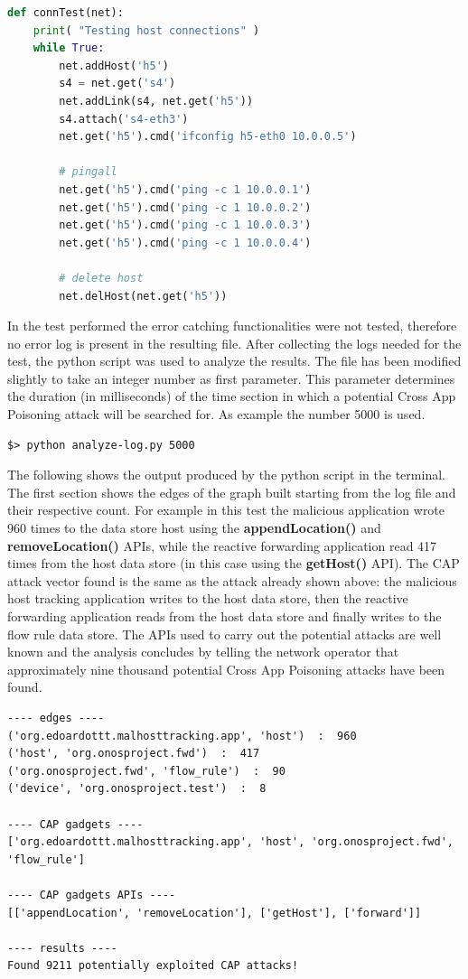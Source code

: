 \begin{lstlisting}[language=python]
def connTest(net):
    print( "Testing host connections" )
    while True:
        net.addHost('h5')
        s4 = net.get('s4')
        net.addLink(s4, net.get('h5'))
        s4.attach('s4-eth3')
        net.get('h5').cmd('ifconfig h5-eth0 10.0.0.5')

        # pingall
        net.get('h5').cmd('ping -c 1 10.0.0.1')
        net.get('h5').cmd('ping -c 1 10.0.0.2')
        net.get('h5').cmd('ping -c 1 10.0.0.3')
        net.get('h5').cmd('ping -c 1 10.0.0.4')
        
        # delete host
        net.delHost(net.get('h5'))
\end{lstlisting}
In the test performed the error catching functionalities were not tested, therefore no error log is present in the resulting file. After collecting the logs needed for the test, the python script was used to analyze the results. The file has been modified slightly to take an integer number as first parameter. This parameter determines the duration (in milliseconds) of the time section in which a potential Cross App Poisoning attack will be searched for. As example the number 5000 is used.
\begin{lstlisting}
$> python analyze-log.py 5000
\end{lstlisting}
The following shows the output produced by the python script in the terminal. The first section shows the edges of the graph built starting from the log file and their respective count. For example in this test the malicious application wrote 960 times to the data store host using the \textbf{appendLocation()} and \textbf{removeLocation()} APIs, while the reactive forwarding application read 417 times from the host data store (in this case using the \textbf{getHost()} API). The CAP attack vector found is the same as the attack already shown above: the malicious host tracking application writes to the host data store, then the reactive forwarding application reads from the host data store and finally writes to the flow rule data store. The APIs used to carry out the potential attacks are well known and the analysis concludes by telling the network operator that approximately nine thousand potential Cross App Poisoning attacks have been found. 
\begin{lstlisting}
---- edges ----
('org.edoardottt.malhosttracking.app', 'host')  :  960
('host', 'org.onosproject.fwd')  :  417
('org.onosproject.fwd', 'flow_rule')  :  90
('device', 'org.onosproject.test')  :  8

---- CAP gadgets ----
['org.edoardottt.malhosttracking.app', 'host', 'org.onosproject.fwd', 'flow_rule']

---- CAP gadgets APIs ----
[['appendLocation', 'removeLocation'], ['getHost'], ['forward']]

---- results ----
Found 9211 potentially exploited CAP attacks!
\end{lstlisting}

